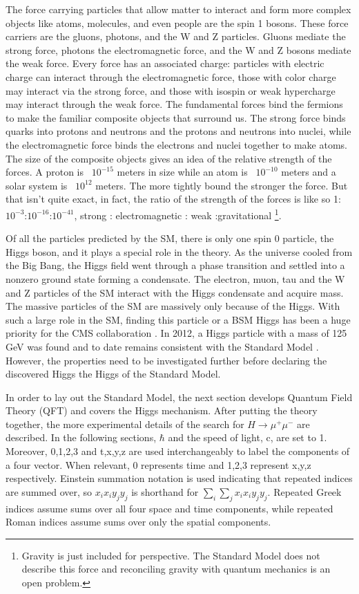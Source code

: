 \documentclass[12pt]{article}
\begin{document}
The force carrying particles that allow matter to interact and form more complex objects like atoms, molecules, and even people are the spin 1 bosons. These force carriers are the gluons, photons, and the W and Z particles. Gluons mediate the strong force, photons the electromagnetic force, and the W and Z bosons mediate the weak force. Every force has an associated charge: particles with electric charge can interact through the electromagnetic force, those with color charge may interact via the strong force, and those with isospin or weak hypercharge may interact through the weak force. The fundamental forces bind the fermions to make the familiar composite objects that surround us. The strong force binds quarks into protons and neutrons and the protons and neutrons into nuclei, while the electromagnetic force binds the electrons and nuclei together to make atoms. The size of the composite objects gives an idea of the relative strength of the forces. A proton is ~$10^{-15}$ meters in size while an atom is ~$10^{-10}$ meters and a solar system is ~$10^{12}$ meters. The more tightly bound the stronger the force. But that isn't quite exact, in fact, the ratio of the strength of the forces is like so 1:$10^{-3}$:$10^{-16}$:$10^{-41}$, strong : electromagnetic : weak :gravitational \footnote{Gravity is just included for perspective. The Standard Model does not describe this force and reconciling gravity with quantum mechanics is an open problem.}. 

Of all the particles predicted by the SM, there is only one spin 0 particle, the Higgs boson, and it plays a special role in the theory. As the universe cooled from the Big Bang, the Higgs field went through a phase transition and settled into a nonzero ground state forming a condensate. The electron, muon, tau and the W and Z particles of the SM interact with the Higgs condensate and acquire mass. The massive particles of the SM are massively only because of the Higgs. With such a large role in the SM, finding this particle or a BSM Higgs has been a huge priority for the CMS collaboration \cite{tdr}. In 2012, a Higgs particle with a mass of 125 GeV was found and to date remains consistent with the Standard Model \cite{atlasdiscovery,cmsdiscovery2012,cmsdiscovery2013}. However, the properties need to be investigated further before declaring the discovered Higgs the Higgs of the Standard Model. 

In order to lay out the Standard Model, the next section develops Quantum Field Theory (QFT) and covers the Higgs mechanism. After putting the theory together, the more experimental details of the search for $H\rightarrow\mu^+\mu^-$ are described. In the following sections, $\hbar$ and the speed of light, c, are set to 1. Moreover, 0,1,2,3 and t,x,y,z are used interchangeably to label the components of a four vector. When relevant, 0 represents time and 1,2,3 represent x,y,z respectively. Einstein summation notation is used indicating that repeated indices are summed over, so $x_ix_i y_jy_j$ is shorthand for $\sum_i\sum_j x_ix_i y_jy_j$. Repeated Greek indices assume sums over all four space and time components, while repeated Roman indices assume sums over only the spatial components. 
\end{document}
